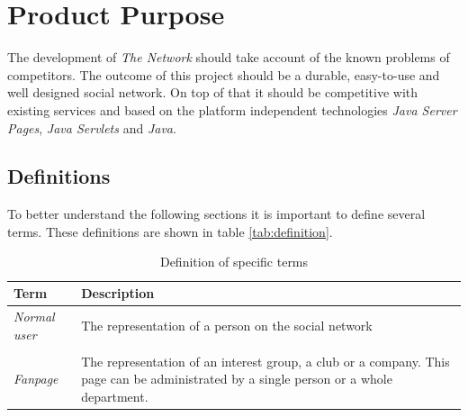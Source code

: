 \documentclass[11pt,a4paper]{report}
\begin{document}
\section{Product Purpose}

The development of \emph{The Network} should take account of the known problems of competitors. The outcome of this project should be a durable, easy-to-use and well designed social network. On top of that it should be competitive with existing services and based on the platform independent technologies \emph{Java Server Pages}, \emph{Java Servlets} and \emph{Java}.

\subsection{Definitions}
To better understand the following sections it is important to define several terms. These definitions are shown in table \vref{tab:definition}.

\begin{table}
    \begin{tabularx}{\textwidth}{l | X}
        Term & Description \\ \hline
        \emph{Normal user} & The representation of a person on the social network \\
        \\
        \emph{Fanpage} & The representation of an interest group, a club or a company. This page can be administrated by a single person or a whole department. \\
    \end{tabularx}
\caption{Definition of specific terms}
\label{tab:definition}
\end{table}
\end{document}
